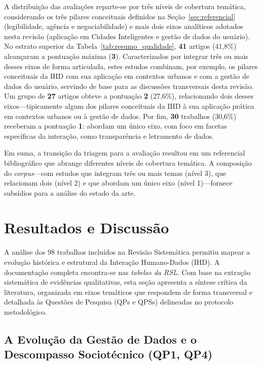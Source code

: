 \documentclass[12pt]{article}
\begin{document}
    A distribuição das avaliações reparte-se por três níveis de cobertura temática, considerando os três pilares conceituais definidos na Seção~\ref{sec:referencial} (legibilidade, agência e negociabilidade) e mais dois eixos analíticos adotados nesta revisão (aplicação em Cidades Inteligentes e gestão de dados do usuário). No estrato superior da Tabela~\ref{tab:resumo_qualidade}, \textbf{41} artigos (41,8\%) alcançaram a pontuação máxima (\textbf{3}). Caracterizados por integrar três ou mais desses eixos de forma articulada, estes estudos combinam, por exemplo, os pilares conceituais da IHD com sua aplicação em contextos urbanos e com a gestão de dados do usuário, servindo de base para as discussões transversais desta revisão. Um grupo de \textbf{27} artigos obteve a pontuação \textbf{2} (27,6\%), relacionando dois desses eixos---tipicamente algum dos pilares conceituais da IHD à sua aplicação prática em contextos urbanos ou à gestão de dados. Por fim, \textbf{30} trabalhos (30,6\%) receberam a pontuação \textbf{1}: abordam um único eixo, com foco em facetas específicas da interação, como transparência e letramento de dados.

    Em suma, a transição da triagem para a avaliação resultou em um referencial bibliográfico que abrange diferentes níveis de cobertura temática. A composição do \textit{corpus}---com estudos que integram três ou mais temas (nível 3), que relacionam dois (nível 2) e que abordam um único eixo (nível 1)---fornece subsídios para a análise do estado da arte.

\flushbottom
\section{Resultados e Discussão}
\label{sec:resultados}

A análise dos 98 trabalhos incluídos na Revisão Sistemática permitiu mapear a evolução histórica e estrutural da Interação Humano-Dados (IHD). A documentação completa encontra-se nas \emph{tabelas da RSL}\footnotemark[\footTabelas]. Com base na extração sistemática de evidências qualitativas, esta seção apresenta a síntese crítica da literatura, organizada em eixos temáticos que respondem de forma transversal e detalhada às Questões de Pesquisa (QPs e QPSs) delineadas no protocolo metodológico.

\subsection{A Evolução da Gestão de Dados e o Descompasso Sociotécnico (QP1, QP4)}
\end{document}
